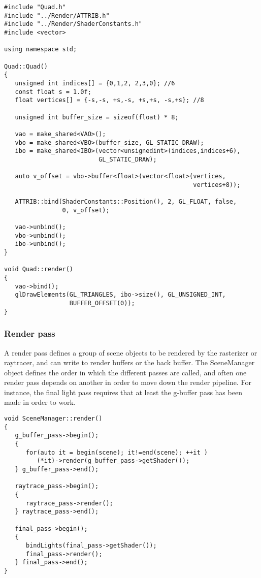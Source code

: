 \begin{lstlisting}
#include "Quad.h"
#include "../Render/ATTRIB.h"
#include "../Render/ShaderConstants.h"
#include <vector>

using namespace std;

Quad::Quad()
{
   unsigned int indices[] = {0,1,2, 2,3,0}; //6
   const float s = 1.0f;
   float vertices[] = {-s,-s, +s,-s, +s,+s, -s,+s}; //8

   unsigned int buffer_size = sizeof(float) * 8;

   vao = make_shared<VAO>();
   vbo = make_shared<VBO>(buffer_size, GL_STATIC_DRAW);
   ibo = make_shared<IBO>(vector<unsignedint>(indices,indices+6),
                          GL_STATIC_DRAW);

   auto v_offset = vbo->buffer<float>(vector<float>(vertices, 
                                                    vertices+8));

   ATTRIB::bind(ShaderConstants::Position(), 2, GL_FLOAT, false, 
                0, v_offset);

   vao->unbind();
   vbo->unbind();
   ibo->unbind();
}

void Quad::render()
{
   vao->bind();
   glDrawElements(GL_TRIANGLES, ibo->size(), GL_UNSIGNED_INT, 
                  BUFFER_OFFSET(0));
}
\end{lstlisting}

\subsubsection{Render pass}
A render pass defines a group of scene objects to be rendered by the rasterizer or raytracer, and can write to render buffers or the back buffer. The SceneManager object defines the order in which the different passes are called, and often one render pass depends on another in order to move down the render pipeline. For instance, the final light pass requires that at least the g-buffer pass has been made in order to work.

\begin{lstlisting}
void SceneManager::render()
{
   g_buffer_pass->begin();
   {
      for(auto it = begin(scene); it!=end(scene); ++it )
         (*it)->render(g_buffer_pass->getShader());
   } g_buffer_pass->end();

   raytrace_pass->begin();
   {
      raytrace_pass->render();
   } raytrace_pass->end();

   final_pass->begin();
   {
      bindLights(final_pass->getShader());
      final_pass->render();
   } final_pass->end();
}
\end{lstlisting}

